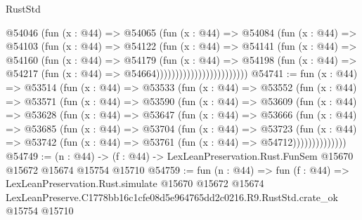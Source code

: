 \begin{lexlean}{RustStd}
\begin{coremodule}
                              @54046
                                (fun (x : @44) =>
                                @54065
                                  (fun (x : @44) =>
                                  @54084
                                    (fun (x : @44) =>
                                    @54103
                                      (fun (x : @44) =>
                                      @54122
                                        (fun (x : @44) =>
                                        @54141
                                          (fun (x : @44) =>
                                          @54160
                                            (fun (x : @44) =>
                                            @54179
                                              (fun (x : @44) =>
                                              @54198
                                                (fun (x : @44) =>
                                                @54217
                                                  (fun (x : @44) => @54664))))))))))))))))))))))))
@54741 := fun (x : @44) =>
  @53514
    (fun (x : @44) =>
    @53533
      (fun (x : @44) =>
      @53552
        (fun (x : @44) =>
        @53571
          (fun (x : @44) =>
          @53590
            (fun (x : @44) =>
            @53609
              (fun (x : @44) =>
              @53628
                (fun (x : @44) =>
                @53647
                  (fun (x : @44) =>
                  @53666
                    (fun (x : @44) =>
                    @53685
                      (fun (x : @44) =>
                      @53704
                        (fun (x : @44) =>
                        @53723
                          (fun (x : @44) =>
                          @53742 (fun (x : @44) => @53761 (fun (x : @44) => @54712))))))))))))))
@54749 := (n : @44) ->
  (f : @44) -> LexLeanPreservation.Rust.FunSem @15670 @15672 @15674 @15754 @15710
@54759 := fun (n : @44) =>
  fun (f : @44) =>
  LexLeanPreservation.Rust.simulate
    @15670
    @15672
    @15674
    LexLeanPreserve.C1778bb16c1cfe08d5e964765dd2c0216.R9.RustStd.crate_ok
    @15754
    @15710
\end{coremodule}
\end{lexlean}
